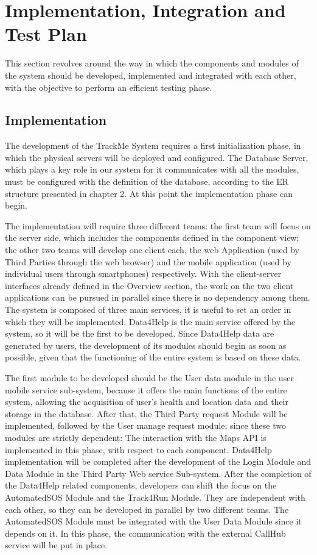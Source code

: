 \chapter{Implementation, Integration and Test Plan}
This section revolves around the way in which the components and modules of the system should be developed, implemented and integrated with each other, with the objective to perform an efficient testing phase.
\section{Implementation}

The development of the TrackMe System requires a first initialization phase, in which the physical servers will be deployed and configured.
The Database Server, which plays a key role in our system for it communicates with all the modules, must be configured with the definition of the database, according to the ER structure presented in chapter 2. At this point the implementation phase can begin.

\vspace{10mm}

The implementation will require three different teams: the first team will focus on the server side, which includes the components defined in the component view; the other two teams will develop one client each, the web Application (used by Third Parties through the web browser) and the mobile application (used by individual users through smartphones) respectively. With the client-server interfaces already defined in the Overview section, the work on the two client applications can be pursued in parallel since there is no dependency among them. 
The system is composed of three main services, it is useful to set an order in which they will be implemented. Data4Help is the main service offered by the system, so it will be the first to be developed. Since Data4Help data are generated by users, the development of its modules should begin as soon as possible, given that the functioning of the entire system is based on these data.

\vspace{4mm}

The first module to be developed should be the User data module in the user mobile service sub-system, because it offers the main functions of the entire system, allowing the acquisition of user's health and location data and their storage in the database.
After that, the Third Party request Module will be implemented, followed by the User manage request module, since these two modules are strictly dependent:
The interaction with the Maps API is implemented in this phase, with respect to each component.
Data4Help implementation will be completed after the development of the Login Module and Data Module in the Third Party Web service Sub-system.
After the completion of the Data4Help related components, developers can shift the focus on the AutomatedSOS Module and the Track4Run Module. They are independent with each other, so they can be developed in parallel by two different teams.
The AutomatedSOS Module must be integrated with the User Data Module since it depends on it. In this phase, the communication with the external CallHub service will be put in place. 


